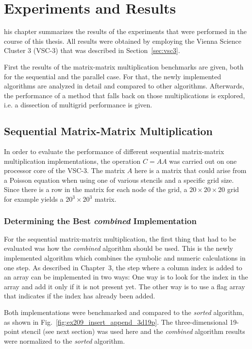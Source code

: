 \chapter{Experiments and Results}
his chapter summarizes the results of the experiments that were performed in the course of this thesis. All results were obtained by employing the Vienna Science Cluster 3 (VSC-3) that was described in Section~\ref{sec:vsc3}. 

First the results of the matrix-matrix multiplication benchmarks are given, both for the sequential and the parallel case. For that, the newly implemented algorithms are analyzed in detail and compared to other algorithms. Afterwards, the performance of a method that falls back on those multiplications is explored, i.e. a dissection of multigrid performance is given.

\section{Sequential Matrix-Matrix Multiplication}

In order to evaluate the performance of different sequential matrix-matrix multiplication implementations, the operation $C = AA$ was carried out on one processor core of the VSC-3. The matrix $A$ here is a matrix that could arise from a Poisson equation when using one of various stencils and a specific grid size. Since there is a row in the matrix for each node of the grid, a $20\times 20 \times 20$ grid for example yields a $20^3 \times 20^3$ matrix.


\subsection{Determining the Best \textit{combined} Implementation}
For the sequential matrix-matrix multiplication, the first thing that had to be evaluated was how the \textit{combined} algorithm should be used. This is the newly implemented algorithm which combines the symbolic and numeric calculations in one step. As described in Chapter~3, the step where a column index is added to an array can be implemented in two ways: One way is to look for the index in the array and add it only if it is not present yet. The other way is to use a flag array that indicates if the index has already been added. 

Both implementations were benchmarked and compared to the \textit{sorted} algorithm, as shown in Fig.~\ref{fig:ex209_insert_append_3d19p}. The three-dimensional 19-point stencil (see next section) was used here and the \textit{combined} algorithm results were normalized to the \textit{sorted} algorithm. 

